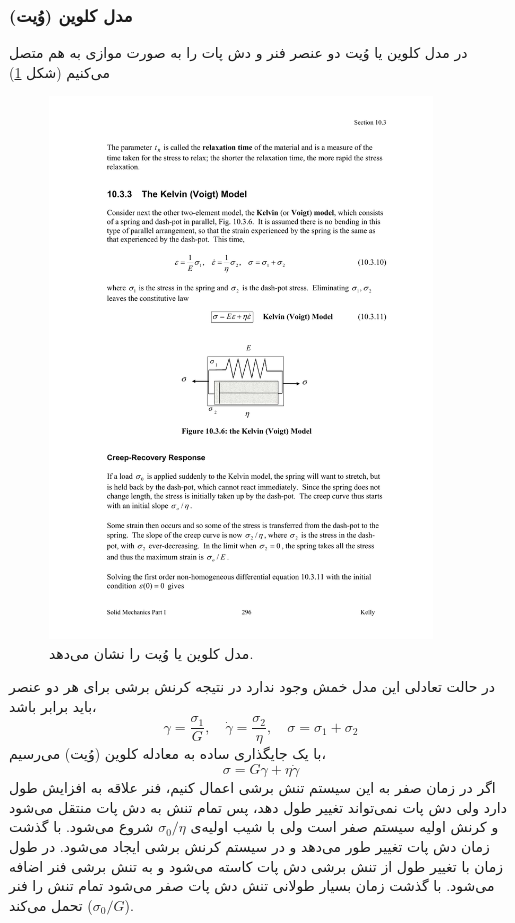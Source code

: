 \subsubsection{مدل کلوین (وُیت)}
در مدل کلوین یا وُیت دو عنصر فنر و دش پات را به صورت موازی به هم متصل می‌کنیم (شکل \ref{fig:KV})
\begin{figure}[htbp]
\begin{center}
\includegraphics[width=4in]{Figs/kelvin_voigt}
\caption{
مدل کلوین یا وُیت را نشان می‌دهد.
}
\label{fig:KV}
\end{center}
\end{figure}
در حالت تعادلی این مدل خمش وجود ندارد در نتیجه کرنش برشی برای هر دو عنصر باید برابر باشد،
\begin{equation}
\gamma=\frac{\sigma_1}{G}, \quad \dot\gamma=\frac{\sigma_2}{\eta}, \quad \sigma=\sigma_1+\sigma_2
\end{equation}
با یک جایگذاری ساده به معادله کلوین (وُیت) می‌رسیم،
\begin{equation}
\sigma=G\gamma+\eta\dot\gamma
\label{eq:KV}
\end{equation}
اگر در زمان صفر به این سیستم تنش برشی اعمال کنیم، فنر علاقه به افزایش طول دارد ولی دش پات نمی‌تواند تغییر طول دهد، پس تمام تنش به دش پات منتقل می‌شود و کرنش اولیه سیستم صفر است ولی با شیب اولیه‌ی $\sigma_0/\eta$ شروع می‌شود. با گذشت زمان دش پات تغییر طور می‌دهد و در سیستم کرنش برشی ایجاد می‌شود. در طول زمان با تغییر طول از  تنش برشی دش پات کاسته می‌شود و به تنش برشی فنر اضافه می‌شود. با گذشت زمان بسیار طولانی تنش دش پات صفر می‌شود تمام تنش را فنر تحمل می‌کند ($\sigma_0/G$).
